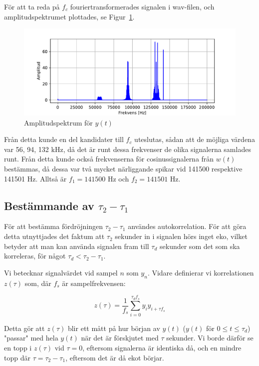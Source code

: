 \documentclass[10pt,twocolumn]{article}
\begin{document}
För att ta reda på $f_c$ fouriertransformerades signalen i wav-filen, och
amplitudspektrumet plottades, se Figur~\ref{fig:yamp}. 
\begin{figure}[h]
    \centering
    \includegraphics[width=\linewidth]{figures/yamp.pdf}
    \caption{Amplitudspektrum för $y(t)$}\label{fig:yamp}
\end{figure}
Från detta kunde en del kandidater till $f_c$ uteslutas, sådan att
de möjliga värdena var 56, 94, 132 kHz, då det är runt dessa frekvenser de
olika signalerna samlades runt. Från detta kunde också frekvenserna för
cosinussignalerna från $w(t)$
bestämmas, då dessa var två mycket närliggande spikar vid 141500 respektive
141501 Hz. Alltså är $f_1=141500$ Hz och $f_2=141501$ Hz.

\subsection{Bestämmande av $\tau_2 - \tau_1$}
För att bestämma fördröjningen $\tau_2 - \tau_1$ användes autokorrelation. För
att göra detta utnyttjades det faktum att $\tau_2$ sekunder in i signalen
hörs inget eko, vilket betyder att man kan använda signalen fram till $\tau_d$
sekunder som det som ska korreleras, för något $\tau_d < \tau_2 - \tau_1$.

Vi betecknar signalvärdet vid sampel $n$ som $y_n$. Vidare definierar vi korrelationen
$z(\tau)$ som, där $f_s$ är sampelfrekvensen:

\begin{equation*}
    z(\tau) = \frac{1}{f_s}\sum_{i=0}^{\tau_d f_s}y_iy_{i + \tau f_s}
\end{equation*}

Detta gör att $z(\tau)$ blir ett mått på hur början av $y(t)$ ($y(t)$ för $0
\leq t \leq \tau_d$)
"passar" med hela $y(t)$ när det är förskjutet med $\tau$ sekunder. Vi
borde därför se en topp i $z(\tau)$ vid $\tau = 0$, eftersom signalerna är identiska då, och en mindre topp där $\tau
= \tau_2 - \tau_1$, eftersom det är då ekot börjar.
\end{document}
